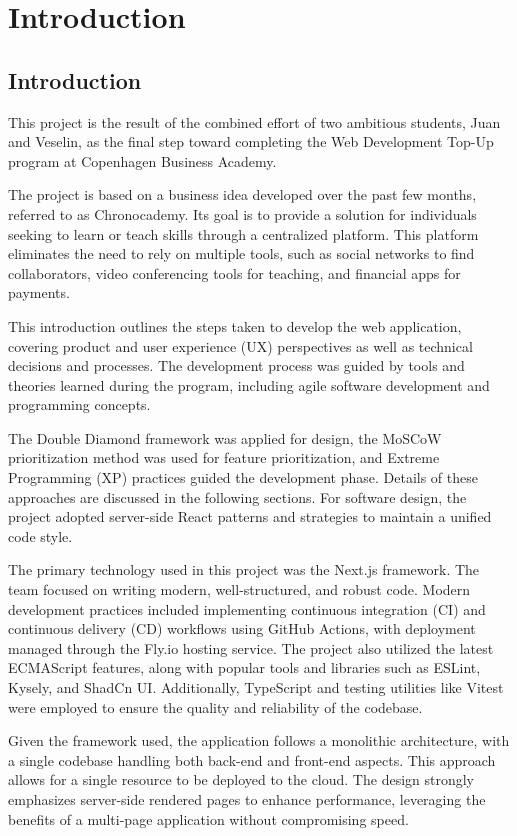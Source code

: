 \chapter{Introduction}\label{ch:introduction}

\section{Introduction}\label{sec:introduction}
This project is the result of the combined effort of two ambitious students, Juan and Veselin, as the final step toward completing the Web Development Top-Up program at Copenhagen Business Academy.

The project is based on a business idea developed over the past few months, referred to as Chronocademy.
Its goal is to provide a solution for individuals seeking to learn or teach skills through a centralized platform.
This platform eliminates the need to rely on multiple tools, such as social networks to find collaborators, video conferencing tools for teaching, and financial apps for payments.

This introduction outlines the steps taken to develop the web application, covering product and user experience (UX) perspectives as well as technical decisions and processes.
The development process was guided by tools and theories learned during the program, including agile software development and programming concepts.

The Double Diamond framework was applied for design, the MoSCoW prioritization method was used for feature prioritization, and Extreme Programming (XP) practices guided the development phase.
Details of these approaches are discussed in the following sections.
For software design, the project adopted server-side React patterns and strategies to maintain a unified code style.

The primary technology used in this project was the Next.js framework.
The team focused on writing modern, well-structured, and robust code.
Modern development practices included implementing continuous integration (CI) and continuous delivery (CD) workflows using GitHub Actions, with deployment managed through the Fly.io hosting service.
The project also utilized the latest ECMAScript features, along with popular tools and libraries such as ESLint, Kysely, and ShadCn UI. Additionally, TypeScript and testing utilities like Vitest were employed to ensure the quality and reliability of the codebase.

Given the framework used, the application follows a monolithic architecture, with a single codebase handling both back-end and front-end aspects.
This approach allows for a single resource to be deployed to the cloud.
The design strongly emphasizes server-side rendered pages to enhance performance, leveraging the benefits of a multi-page application without compromising speed.

